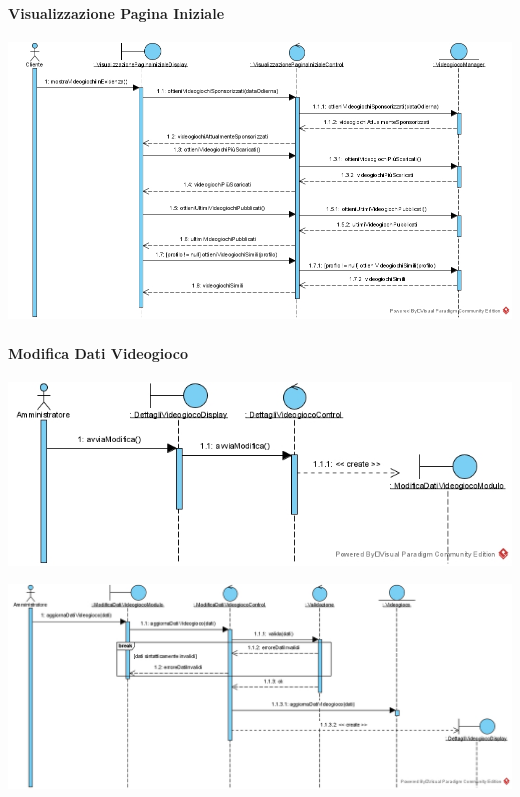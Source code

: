 \newpage
\paragraph{Visualizzazione Pagina Iniziale}
\begin{center}
\includegraphics[width=\textwidth,height=\textheight,keepaspectratio]{Figure/SequenceDiagrams/VisualizzazionePaginaIniziale.jpg}
\end{center}

\paragraph{Modifica Dati Videogioco}
\begin{center}
\includegraphics[width=\textwidth,height=\textheight,keepaspectratio]{Figure/SequenceDiagrams/ModificaDatiVideogiocoEntry.jpg}
\end{center}

\newpage
\begin{center}
\includegraphics[width=\textwidth,height=\textheight,keepaspectratio]{Figure/SequenceDiagrams/ModificaDatiVideogiocoInner.jpg}
\end{center}

